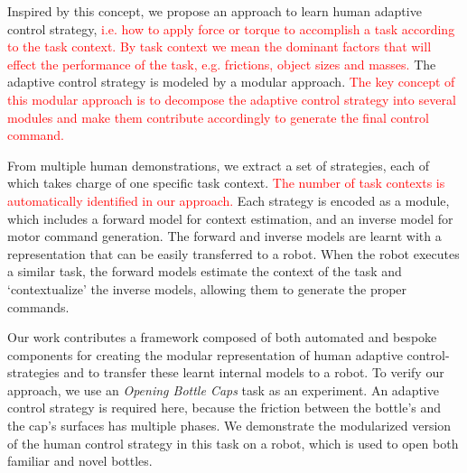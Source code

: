 Inspired by this concept, we propose an approach to learn human
adaptive control strategy, \textcolor{red}{i.e. how to apply force or torque to accomplish a task according to the task context. By task context we mean  the dominant factors that will effect the performance of the task, e.g. frictions, object sizes and masses.} The adaptive control strategy is modeled by a modular approach. 
\textcolor{red}{The key concept of this modular approach is to decompose the adaptive control strategy into several modules and make them contribute accordingly to generate the final control command.}


From multiple human demonstrations, we extract a set of strategies, each of which takes charge of one specific task context. \textcolor{red}{The number of task contexts is automatically identified in our approach. }
Each strategy is encoded as a module, which includes a forward model for context
estimation, and an inverse model for motor command generation.  %
The forward and inverse models are learnt with a representation
that can be easily transferred to a
robot. When the robot executes a similar task, the forward models
estimate the context of the task and
`contextualize' the inverse models, allowing them to generate the proper commands.


Our work contributes a framework composed of both automated and
bespoke components for creating the modular representation of
human adaptive control-strategies %
and to transfer these learnt internal models to a robot. To verify our
approach, we use an \emph{Opening Bottle Caps} task as an
experiment. An adaptive control strategy is required here, because the
friction between the bottle's and the cap's surfaces has multiple
phases. We demonstrate the modularized version of the human control
strategy in this task on a robot, which is used to open both familiar
and novel bottles.

